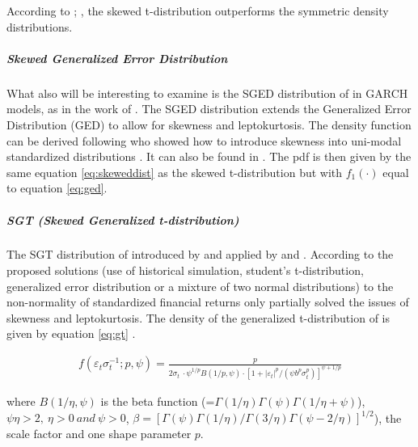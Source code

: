 \documentclass[a4paper, twoside]{templates/ociamthesis}
\begin{document}
\noindent According to \textcite{giot2003}; \textcite{giot2004}, the skewed t-distribution outperforms the symmetric density distributions.

\hypertarget{skewed-generalized-error-distribution}{%
\subparagraph{Skewed Generalized Error Distribution}\label{skewed-generalized-error-distribution}}

\noindent What also will be interesting to examine is the SGED distribution of \textcite{theodossiou2000} in GARCH models, as in the work of \textcite{lee2008}. The SGED distribution extends the Generalized Error Distribution (GED) to allow for skewness and leptokurtosis. The density function can be derived following \textcite{fernández1998} who showed how to introduce skewness into uni-modal standardized distributions \autocite{trottier2015}. It can also be found in \textcite{theodossiou2000}. The pdf is then given by the same equation \eqref{eq:skeweddist} as the skewed t-distribution but with \(f_1(\cdot)\) equal to equation \eqref{eq:ged}.

\hypertarget{sgt-skewed-generalized-t-distribution}{%
\subparagraph{SGT (Skewed Generalized t-distribution)}\label{sgt-skewed-generalized-t-distribution}}

\noindent The SGT distribution of introduced by \textcite{theodossiou1998} and applied by \textcite{bali2007} and \textcite{bali2008}. According to \textcite{bali2008} the proposed solutions (use of historical simulation, student's t-distribution, generalized error distribution or a mixture of two normal distributions) to the non-normality of standardized financial returns only partially solved the issues of skewness and leptokurtosis. The density of the generalized t-distribution of \textcite{mcdonald1988} is given by equation \eqref{eq:gt} \autocite{bollerslev1994}.

\begin{align}
f\left(\varepsilon_{t} \sigma_{t}^{-1} ; p, \psi\right)=\frac{p}{2 \sigma_{t} \ \cdot \psi^{1 / p} B(1 / p, \psi) \cdot\left[1+\left|\varepsilon_{t}\right|^{p} /\left(\psi b^{p} \sigma_{t}^{p}\right)\right]^{\psi+1 / p}}
 \label{eq:gt}
\end{align}

\noindent where \(B(1 / \eta, \psi)\) is the beta function (=\(\Gamma(1 / \eta) \Gamma(\psi) \Gamma(1 / \eta+\psi)\)), \(\psi\eta>2,\ \eta>0 \ and \ \psi >0\), \(\beta = [\Gamma(\psi)\Gamma(1 / \eta)/\Gamma(3 / \eta)\Gamma(\psi - 2/\eta)]^{1/2}\)), the scale factor and one shape parameter \(p\).
\end{document}

